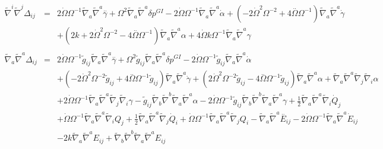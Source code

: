 \documentclass[10pt,letterpaper]{article}
\numberwithin{equation}{section}
\begin{document}
\begin{appendices}
\begin{eqnarray}
\tilde\nabla^i\tilde\nabla^j\Delta_{ij}&=& 2 \dot{\Omega} \Omega^{-1} \tilde{\nabla}_{a}\tilde{\nabla}^{a}\overset{..}{\gamma} + \Omega^2 \tilde{\nabla}_{a}\tilde{\nabla}^{a}\delta p^{GI}{} - 2 \dot{\Omega} \Omega^{-1} \tilde{\nabla}_{a}\tilde{\nabla}^{a}\dot{\alpha} + (-2 \dot{\Omega}^2 \Omega^{-2} + 4 \overset{..}{\Omega} \Omega^{-1}) \tilde{\nabla}_{a}\tilde{\nabla}^{a}\dot{\gamma} \nonumber \\ 
&& + (2 k + 2 \dot{\Omega}^2 \Omega^{-2} - 4 \overset{..}{\Omega} \Omega^{-1}) \tilde{\nabla}_{a}\tilde{\nabla}^{a}\alpha + 4 \dot{\Omega} k \Omega^{-1} \tilde{\nabla}_{a}\tilde{\nabla}^{a}\gamma 
\\  \nonumber\\ 
\tilde\nabla_a\tilde\nabla^a \Delta_{ij}&=& 2 \dot{\Omega} \Omega^{-1} \tilde{g}_{ij} \tilde{\nabla}_{a}\tilde{\nabla}^{a}\overset{..}{\gamma} + \Omega^2 \tilde{g}_{ij} \tilde{\nabla}_{a}\tilde{\nabla}^{a}\delta p^{GI}{} - 2 \dot{\Omega} \Omega^{-1} \tilde{g}_{ij} \tilde{\nabla}_{a}\tilde{\nabla}^{a}\dot{\alpha} \nonumber \\ 
&& + (-2 \dot{\Omega}^2 \Omega^{-2} \tilde{g}_{ij} + 4 \overset{..}{\Omega} \Omega^{-1} \tilde{g}_{ij}) \tilde{\nabla}_{a}\tilde{\nabla}^{a}\dot{\gamma} + (2 \dot{\Omega}^2 \Omega^{-2} \tilde{g}_{ij} - 4 \overset{..}{\Omega} \Omega^{-1} \tilde{g}_{ij}) \tilde{\nabla}_{a}\tilde{\nabla}^{a}\alpha + \tilde{\nabla}_{a}\tilde{\nabla}^{a}\tilde{\nabla}_{j}\tilde{\nabla}_{i}\alpha \nonumber \\ 
&& + 2 \dot{\Omega} \Omega^{-1} \tilde{\nabla}_{a}\tilde{\nabla}^{a}\tilde{\nabla}_{j}\tilde{\nabla}_{i}\gamma -  \tilde{g}_{ij} \tilde{\nabla}_{b}\tilde{\nabla}^{b}\tilde{\nabla}_{a}\tilde{\nabla}^{a}\alpha - 2 \dot{\Omega} \Omega^{-1} \tilde{g}_{ij} \tilde{\nabla}_{b}\tilde{\nabla}^{b}\tilde{\nabla}_{a}\tilde{\nabla}^{a}\gamma +\tfrac{1}{2} \tilde{\nabla}_{a}\tilde{\nabla}^{a}\tilde{\nabla}_{i}\dot{Q}_{j} \nonumber \\ 
&& + \dot{\Omega} \Omega^{-1} \tilde{\nabla}_{a}\tilde{\nabla}^{a}\tilde{\nabla}_{i}Q_{j} + \tfrac{1}{2} \tilde{\nabla}_{a}\tilde{\nabla}^{a}\tilde{\nabla}_{j}\dot{Q}_{i} + \dot{\Omega} \Omega^{-1} \tilde{\nabla}_{a}\tilde{\nabla}^{a}\tilde{\nabla}_{j}Q_{i}- \tilde{\nabla}_{a}\tilde{\nabla}^{a}\overset{..}{E}_{ij} - 2 \dot{\Omega} \Omega^{-1} \tilde{\nabla}_{a}\tilde{\nabla}^{a}\dot{E}_{ij} \nonumber \\ 
&& - 2 k \tilde{\nabla}_{a}\tilde{\nabla}^{a}E_{ij} + \tilde{\nabla}_{b}\tilde{\nabla}^{b}\tilde{\nabla}_{a}\tilde{\nabla}^{a}E_{ij}
\\  \nonumber\\ 

\end{eqnarray}
\end{appendices}
\end{document}
